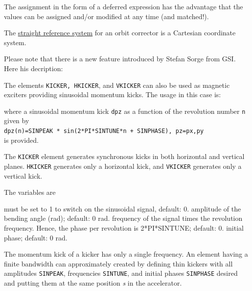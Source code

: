 The assignment in the form of a deferred expression has the advantage
that the values can be assigned and/or modified at any time (and
matched!).   

The \hyperref[subsec:local-straight]{straight reference system} for an
orbit corrector is a Cartesian coordinate system.  


Please note that there is a new feature introduced by Stefan Sorge from
GSI. Here his decription:

The elements \texttt{KICKER, HKICKER}, and \texttt{VKICKER} can also be used as 
magnetic exciters providing sinusoidal momentum kicks. The usage in this case 
is:

where a sinusoidal momentum kick \texttt{dpz} as a function of the  revolution
number \texttt{n} given by\\   
\texttt{dpz(n)=SINPEAK * sin(2*PI*SINTUNE*n + SINPHASE), pz=px,py} \\ 
is provided. 

The \texttt{KICKER} element generates synchronous kicks in both horizontal and
vertical planes. \texttt{HKICKER} generates only a horizontal kick, and
\texttt{VKICKER} generates only a vertical kick.    

The variables are 

\begin{madlist}
    must be set to 1 to switch on the sinusoidal
     signal, default: 0.  
    amplitude of the bending angle (rad); default: 0
     rad.   
    frequency of the signal times the revolution
     frequency.  Hence, the phase per revolution is 2*PI*SINTUNE;
     default: 0.   
    initial phase; default: 0 rad.  
\end{madlist}

The momentum kick of a kicker has only a single frequency. An element
having a finite bandwidth can approximately created by defining  thin
kickers with all amplitudes \texttt{SINPEAK}, frequencies
\texttt{SINTUNE}, and initial phases \texttt{SINPHASE} desired and
putting them at the same position \textit{s} in the accelerator.



